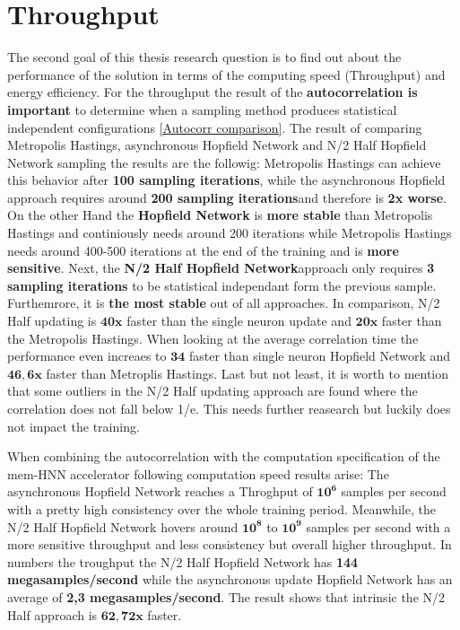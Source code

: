 \section{Throughput}

The second goal of this thesis research question is to find out about the performance of the solution in terms of the 
computing speed (Throughput) and energy efficiency. 
For the throughput the result of the \textbf{autocorrelation is important} to determine when a sampling method produces statistical independent configurations \ref{Autocorr comparison}.
The result of comparing Metropolis Hastings, asynchronous Hopfield Network and N/2 Half Hopfield Network sampling the results are the followig:
Metropolis Hastings can achieve this behavior after \textbf{100 sampling iterations}, while the asynchronous Hopfield approach requires around \textbf{200 sampling iterations}and therefore 
is \textbf{2x worse}. On the other Hand the \textbf{Hopfield Network} is \textbf{more stable} than Metropolis Hastings and continiously needs around 200 iterations 
while Metropolis Hastings needs around 400-500 iterations at the end of the training and is \textbf{more sensitive}. 
Next, the \textbf{N/2 Half Hopfield Network}approach only requires \textbf{3 sampling iterations} to be statistical independant form the previous sample.
Furthemrore, it is \textbf{the most stable} out of all approaches. In comparison, N/2 Half updating is \(\mathbf{40x}\) faster than the single neuron
update and \(\mathbf{20x}\) faster than the Metropolis Hastings. 
When looking at the average correlation time the performance even increaes to \(\mathbf{34}\) faster than single neuron Hopfield Network and \(\mathbf{46,6x}\)
faster than Metroplis Hastings.
Last but not least, it is worth to mention that some outliers in the N/2 Half updating approach are found where 
the correlation does not fall below 1/e. This needs further reasearch but luckily does not impact the training. 

When combining the autocorrelation with the computation specification of the \ac{mem-HNN} accelerator following computation speed results arise:
The asynchronous Hopfield Network reaches a Throghput of \(\mathbf{10^6}\) samples per second with a pretty high
consistency over the whole training period. Meanwhile, the N/2 Half Hopfield Network 
hovers around \(\mathbf{10^8}\) to \(\mathbf{10^9}\) samples per second with a more sensitive throughput and less consistency 
but overall higher throughput.
In numbers the troughput the N/2 Half Hopfield Network has \textbf{144 megasamples/second} while the asynchronous update Hopfield Network has an average of \textbf{2,3 megasamples/second}.
The result shows that intrinsic the N/2 Half approach is \(\mathbf{62,72x}\) faster. 

